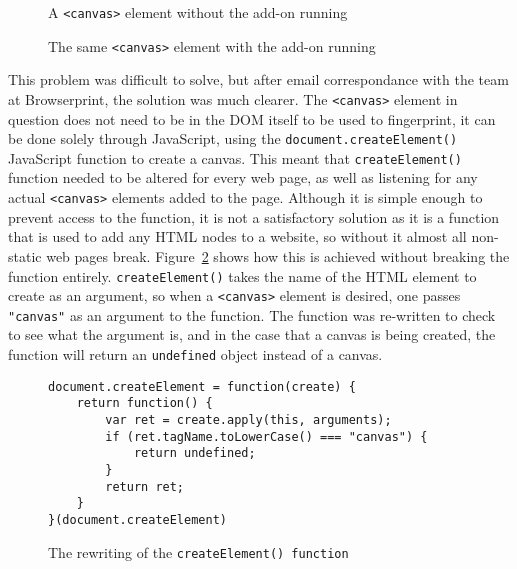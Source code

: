 \begin{figure}[!tbp]
    \centering
    \begin{minipage}[b]{0.4\textwidth}
        \caption{A \texttt{<canvas>} element without the add-on running}
        \label{fig:hello-world-canvas}
    \end{minipage}
    \hfill
    \begin{minipage}[b]{0.4\textwidth}
        \caption{The same \texttt{<canvas>} element with the add-on running}
        \label{fig:blank-canvas}
    \end{minipage}
\end{figure}

This problem was difficult to solve, but after email correspondance with the team at Browserprint, the solution was much clearer.
The \texttt{<canvas>} element in question does not need to be in the DOM itself to be used to fingerprint, it can be done solely through JavaScript, using the \texttt{document.createElement()} JavaScript function to create a canvas.
This meant that \texttt{createElement()} function needed to be altered for every web page, as well as listening for any actual \texttt{<canvas>} elements added to the page.
Although it is simple enough to prevent access to the function, it is not a satisfactory solution as it is a function that is used to add any HTML nodes to a website, so without it almost all non-static web pages break.
Figure~\ref{lst:create-element} shows how this is achieved without breaking the function entirely.
\texttt{createElement()} takes the name of the HTML element to create as an argument, so when a \texttt{<canvas>} element is desired, one passes \texttt{"canvas"} as an argument to the function.
The function was re-written to check to see what the argument is, and in the case that a canvas is being created, the function will return an \texttt{undefined} object instead of a canvas.

\begin{figure}[h]
\begin{lstlisting}
document.createElement = function(create) {
    return function() {
        var ret = create.apply(this, arguments);
        if (ret.tagName.toLowerCase() === "canvas") {
            return undefined;
        }
        return ret;
    }
}(document.createElement)
\end{lstlisting}
\caption{The rewriting of the \texttt{createElement() function}}
\label{lst:create-element}
\end{figure}

